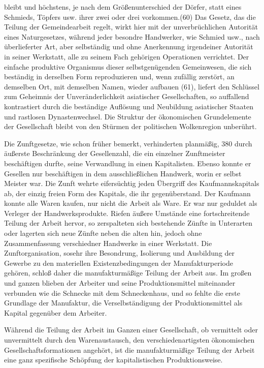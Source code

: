 {bleibt und höchstens, je nach dem Größenunterschied der Dörfer, statt
eines Schmieds, Töpfers usw. ihrer zwei oder drei vorkommen.(60) Das
Gesetz, das die Teilung der Gemeindearbeit regelt, wirkt hier mit der
unverbrüchlichen Autorität eines Naturgesetzes, während jeder besondre
Handwerker, wie Schmied usw., nach überlieferter Art, aber selbständig
und ohne Anerkennung irgendeiner Autorität in seiner Werkstatt, alle zu
seinem Fach gehörigen Operationen verrichtet. Der einfache produktive
Organismus dieser selbstgenügenden Gemeinwesen, die sich beständig in
derselben Form reproduzieren und, wenn zufällig zerstört, an demselben
Ort, mit demselben Namen, wieder aufbauen (61), liefert den Schlüssel
zum Geheimnis der Unveränderlichkeit asiatischer Gesellschaften, so
auffallend kontrastiert durch die beständige Auflösung und Neubildung
asiatischer Staaten und rastlosen Dynastenwechsel. Die Struktur der
ökonomischen Grundelemente der Gesellschaft bleibt von den Stürmen der
politischen Wolkenregion unberührt.

Die Zunftgesetze, wie schon früher bemerkt, verhinderten planmäßig,
\num{380} durch äußerste Beschränkung der
Gesellenzahl, die ein einzelner Zunftmeister beschäftigen durfte, seine
Verwandlung in einen Kapitalisten. Ebenso konnte er Gesellen nur
beschäftigen in dem ausschließlichen Handwerk, worin er selbst Meister
war. Die Zunft wehrte eifersüchtig jeden Übergriff des Kaufmannskapitals
ab, der einzig freien Form des Kapitals, die ihr gegenüberstand. Der
Kaufmann konnte alle Waren kaufen, nur nicht die Arbeit als Ware. Er war
nur geduldet als Verleger der Handwerksprodukte. Riefen äußere Umstände
eine fortschreitende Teilung der Arbeit hervor, so zerspalteten sich
bestehende Zünfte in Unterarten oder lagerten sich neue Zünfte neben die
alten hin, jedoch ohne Zusammenfassung verschiedner Handwerke in einer
Werkstatt. Die Zunftorganisation, sosehr ihre Besondrung, Isolierung und
Ausbildung der Gewerbe zu den materiellen Existenzbedingungen der
Manufakturperiode gehören, schloß daher die manufakturmäßige Teilung der
Arbeit aus. Im großen und ganzen blieben der Arbeiter und seine
Produktionsmittel miteinander verbunden wie die Schnecke mit dem
Schneckenhaus, und so fehlte die erste Grundlage der Manufaktur, die
Verselbständigung der Produktionsmittel als Kapital gegenüber dem
Arbeiter.

Während die Teilung der Arbeit im Ganzen einer Gesellschaft, ob
vermittelt oder unvermittelt durch den Warenaustausch, den
verschiedenartigsten ökonomischen Gesellschaftsformationen angehört, ist
die manufakturmäßige Teilung der Arbeit eine ganz spezifische Schöpfung
der kapitalistischen Produktionsweise.

}
